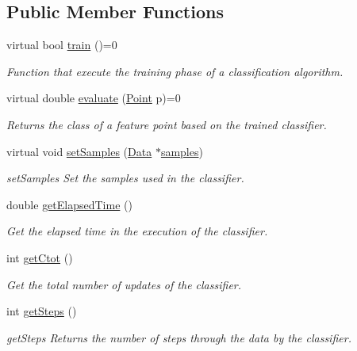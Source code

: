 \subsection*{Public Member Functions}
\begin{DoxyCompactItemize}
\item 
virtual bool \hyperlink{class_classifier_a2306a5de27555ab093593ac9642bc7d9}{train} ()=0
\begin{DoxyCompactList}\small\item\em Function that execute the training phase of a classification algorithm. \end{DoxyCompactList}\item 
virtual double \hyperlink{class_classifier_ae8e9554823b85ddc2dcad2955da811d9}{evaluate} (\hyperlink{class_point}{Point} p)=0
\begin{DoxyCompactList}\small\item\em Returns the class of a feature point based on the trained classifier. \end{DoxyCompactList}\item 
virtual void \hyperlink{class_classifier_a4b16736670cba8f4c8397b6a90c8c799}{set\+Samples} (\hyperlink{class_data}{Data} $\ast$\hyperlink{class_classifier_a515c225d0da93df02ca79f9f87811d17}{samples})
\begin{DoxyCompactList}\small\item\em set\+Samples Set the samples used in the classifier. \end{DoxyCompactList}\item 
double \hyperlink{class_classifier_ab47b67b061041193aa3ae2a7856f4980}{get\+Elapsed\+Time} ()
\begin{DoxyCompactList}\small\item\em Get the elapsed time in the execution of the classifier. \end{DoxyCompactList}\item 
int \hyperlink{class_classifier_ab80a78cd6a4efc59b16f5b80cd64dc63}{get\+Ctot} ()
\begin{DoxyCompactList}\small\item\em Get the total number of updates of the classifier. \end{DoxyCompactList}\item 
int \hyperlink{class_classifier_a1fb3e4dfd80c154e89603c8fa1b11b76}{get\+Steps} ()
\begin{DoxyCompactList}\small\item\em get\+Steps Returns the number of steps through the data by the classifier. \end{DoxyCompactList}\item 

\end{DoxyCompactItemize}
